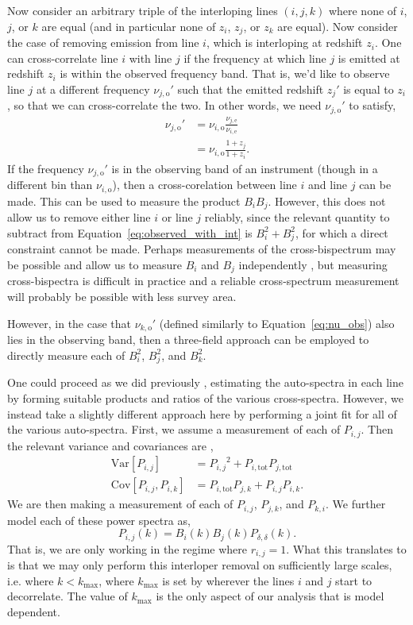 \documentclass{aastex62}
\newcommand{\beq}{\begin{equation}}
\newcommand{\eeq}{\end{equation}}
\newcommand{\mynu}[2]{\ensuremath{\nu_{#1,\text{#2}}}}
\newcommand{\denps}{\ensuremath{P_{\delta,\delta}}}
\newcommand{\xps}[2]{\ensuremath{P_{#1,#2}}}
\newcommand{\pstot}[1]{\ensuremath{P_{#1,\text{tot}}}}
\newcommand{\Var}[1]{\mathrm{Var}[#1]}
\newcommand{\Cov}[2]{\mathrm{Cov}[#1,#2]}
\begin{document}
Now consider an arbitrary triple of the interloping lines $(i, j, k)$ where
none of $i$, $j$, or $k$ are equal (and in particular none of $z_i$, $z_j$, or
$z_k$ are equal). Now consider the case of removing emission from line $i$,
which is interloping at redshift $z_i$. One can cross-correlate line $i$ with
line $j$ if the frequency at which line $j$ is emitted at redshift $z_i$ is
within the observed frequency band. That is, we'd like to observe line $j$ at
a different frequency $\mynu{j}{o}'$ such that the emitted redshift $z_j'$ is
equal to $z_i$, so that we can cross-correlate the two. In other words, we
need $\mynu{j}{o}'$ to satisfy,
\beq\label{eq:nu_obs}
\begin{split}
\mynu{j}{o}' &= \mynu{i}{o} \frac{\mynu{j}{e}}{\mynu{i}{e}} \\
&= \mynu{i}{o} \frac{1+z_j}{1+z_i}\text{.}
\end{split}
\eeq
If the frequency $\mynu{j}{o}'$ is in the observing band of an instrument
(though in a different bin than $\mynu{i}{o}$), then a cross-corelation
between line $i$ and line $j$ can be made. This can be used to measure the
product $B_iB_j$. However, this does not allow us to remove either line $i$ or
line $j$ reliably, since the relevant quantity to subtract from
Equation~\ref{eq:observed_with_int} is $B_i^2 + B_j^2$, for which a direct
constraint cannot be made. Perhaps measurements of the cross-bispectrum may be
possible and allow us to measure $B_i$ and $B_j$ independently
\citep{2018ApJ...867...26B}, but measuring cross-bispectra is difficult in
practice and a reliable cross-spectrum measurement will probably be possible
with less survey area.

However, in the case that $\mynu{k}{o}'$ (defined similarly to
Equation~\ref{eq:nu_obs}) also lies in the observing band, then a three-field
approach can be employed to directly measure each of $B_i^2$, $B_j^2$, and
$B_k^2$.

One could proceed as we did previously \citep{2018arXiv181110609B}, estimating
the auto-spectra in each line by forming suitable products and ratios of the
various cross-spectra. However, we instead take a slightly different approach
here by performing a joint fit for all of the various auto-spectra. First, we
assume a measurement of each of $\xps{i}{j}$. Then the relevant variance and
covariances are \citep[e.g.][]{2015JCAP...03..034V},
\beq
\begin{split}
\Var{\xps{i}{j}} &= \xps{i}{j}^2 + \pstot{i}\pstot{j} \\
\Cov{\xps{i}{j}}{\xps{i}{k}} &= \pstot{i}\xps{j}{k} +
\xps{i}{j}\xps{i}{k}\text{.}
\end{split}
\eeq
We are then making a measurement of each of $\xps{i}{j}$, $\xps{j}{k}$,
and $\xps{k}{i}$. We further model each of these power spectra as,
\beq
\xps{i}{j}(k) = B_i(k) B_j(k) \denps(k)\text{.}
\eeq
That is, we are only working in the regime where $r_{i,j}=1$. What this
translates to is that we may only perform this interloper removal on
sufficiently large scales, i.e. where $k<k_{\text{max}}$, where
$k_{\text{max}}$ is set by wherever the lines $i$ and $j$ start to
decorrelate. The value of $k_{\text{max}}$ is the only aspect of our analysis
that is model dependent.
\end{document}
